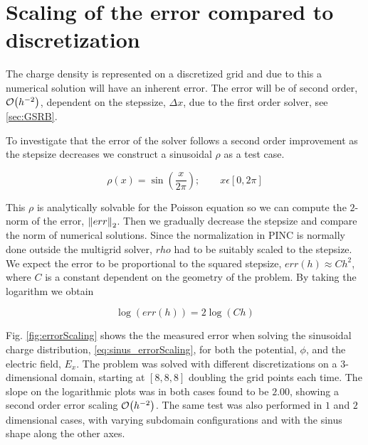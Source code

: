 \section{Scaling of the error compared to discretization}
The charge density is represented on a discretized grid and due to this a numerical solution
will have an inherent error.
The error will be of second order, \(\order{h^{-2}}\), dependent on the
stepssize, \(\Delta x\), due to the first order solver, see \cref{sec:GSRB}.

To investigate that the error of the solver follows a second order improvement
as the stepsize decreases we construct a sinusoidal \(\rho\) as a test case.

\begin{equation}
    \rho(x) = \sin{\left(\frac{x}{2\pi}\right)}; \qquad x\epsilon[0,2\pi] \label{eq:sinus_errorScaling}
\end{equation}

This \(\rho\) is analytically solvable for the Poisson equation so we can compute the
\(2\)-norm of the error, \(\norm{err}_2\). Then we gradually decrease the stepsize
and compare the norm of numerical solutions. Since the normalization in PINC
is normally done outside the multigrid solver, \(rho\) had to be suitably scaled
to the stepsize. We expect the error to be proportional to the squared stepsize, \(err(h) \approx Ch^2\), where \(C\) is a constant dependent on the geometry of the problem.
By taking the logarithm we obtain

\begin{equation}
    \log(err(h)) = 2\log(Ch)
\end{equation}

Fig. \ref{fig:errorScaling} shows the
the measured error when solving the sinusoidal charge distribution, \cref{eq:sinus_errorScaling},
for both the potential, \(\phi\), and the electric field, \(E_x\).
The problem was solved with different discretizations on a \(3\)-dimensional domain,
starting at \([8,8,8]\) doubling the grid points each time. The slope on the logarithmic plots
was in both cases found to be \(2.00\), showing a second order error scaling \(\order{h^{-2}}\).
The same test was also performed in \(1\) and \(2\) dimensional cases, with varying
subdomain configurations and with the sinus shape along the other axes.

